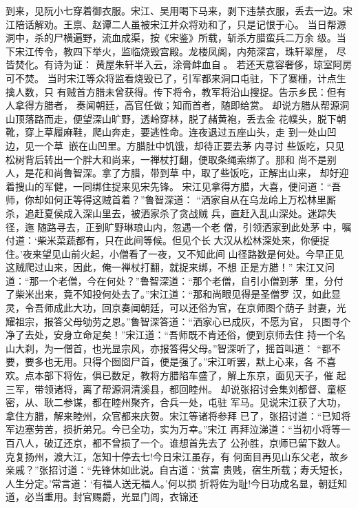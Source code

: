 到来，见阮小七穿着御衣服。宋江、吴用喝下马来，剥下违禁衣服，丢去一边。宋
江陪话解劝。王禀、赵谭二人虽被宋江并众将劝和了，只是记恨于心。
当日帮源洞中，杀的尸横遍野，流血成渠，按《宋鉴》所载，斩杀方腊蛮兵二万余
级。当下宋江传令，教四下举火，监临烧毁宫殿。龙楼凤阁，内苑深宫，珠轩翠屋，
尽皆焚化。有诗为证：
黄屋朱轩半入云，涂膏衅血自。
若还天意容奢侈，琼室阿房可不焚。
当时宋江等众将监看烧毁已了，引军都来洞口屯驻，下了寨栅，计点生擒人数，只
有贼首方腊未曾获得。传下将令，教军将沿山搜捉。告示乡民：但有人拿得方腊者，
奏闻朝廷，高官任做；知而首者，随即给赏。
却说方腊从帮源洞山顶落路而走，便望深山旷野，透岭穿林，脱了赭黄袍，丢去金
花幞头，脱下朝靴，穿上草履麻鞋，爬山奔走，要逃性命。连夜退过五座山头，走
到一处山凹边，见一个草，嵌在山凹里。方腊肚中饥饿，却待正要去茅内寻讨
些饭吃，只见松树背后转出一个胖大和尚来，一禅杖打翻，便取条绳索绑了。那和
尚不是别人，是花和尚鲁智深。拿了方腊，带到草中，取了些饭吃，正解出山来，
却好迎着搜山的军健，一同绑住捉来见宋先锋。
宋江见拿得方腊，大喜，便问道：“吾师，你却如何正等得这贼首着？”鲁智深道：
“洒家自从在乌龙岭上万松林里厮杀，追赶夏侯成入深山里去，被洒家杀了贪战贼
兵，直赶入乱山深处。迷踪失径，迤随路寻去，正到旷野琳琅山内，忽遇一个老
僧，引领洒家到此处茅中，嘱付道：‘柴米菜蔬都有，只在此间等候。但见个长
大汉从松林深处来，你便捉住。’夜来望见山前火起，小僧看了一夜，又不知此间
山径路数是何处。今早正见这贼爬过山来，因此，俺一禅杖打翻，就捉来绑，不想
正是方腊！”
宋江又问道：“那一个老僧，今在何处？”鲁智深道：“那个老僧，自引小僧到茅
里，分付了柴米出来，竟不知投何处去了。”宋江道：“那和尚眼见得是圣僧罗
汉，如此显灵，令吾师成此大功，回京奏闻朝廷，可以还俗为官，在京师图个荫子
封妻，光耀祖宗，报答父母劬劳之恩。”鲁智深答道：“洒家心已成灰，不愿为官，
只图寻个净了去处，安身立命足矣！”宋江道：“吾师既不肯还俗，便到京师去住
持一个名山大刹，为一僧首，也光显宗风，亦报答得父母。”智深听了，摇首叫道：
“都不要，要多也无用。只得个囫囵尸首，便是强了。”宋江听罢，默上心来，各
不喜欢。点本部下将佐，俱已数足，教将方腊陷车盛了，解上东京，面见天子，催
起三军，带领诸将，离了帮源洞清溪县，都回睦州。
却说张招讨会集刘都督、童枢密，从、耿二参谋，都在睦州聚齐，合兵一处，屯驻
军马。见说宋江获了大功，拿住方腊，解来睦州，众官都来庆贺。宋江等诸将参拜
已了，张招讨道：“已知将军边塞劳苦，损折弟兄。今已全功，实为万幸。”宋江
再拜泣涕道：“当初小将等一百八人，破辽还京，都不曾损了一个。谁想首先去了
公孙胜，京师已留下数人。克复扬州，渡大江，怎知十停去七!今日宋江虽存，有
何面目再见山东父老，故乡亲戚？”张招讨道：“先锋休如此说。自古道：‘贫富
贵贱，宿生所载；寿夭短长，人生分定。’常言道：‘有福人送无福人。’何以损
折将佐为耻!今日功成名显，朝廷知道，必当重用。封官赐爵，光显门闾，衣锦还

